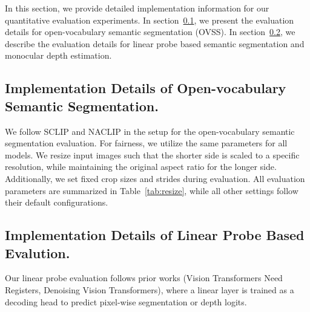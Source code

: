 In this section, we provide detailed implementation information for our quantitative evaluation experiments. 
In section~\ref{ovssimpl}, we present the evaluation details for open-vocabulary semantic segmentation (OVSS). In section~\ref{linearimpl}, we describe the evaluation details for linear probe based semantic segmentation and monocular depth estimation.

\subsection{Implementation Details of Open-vocabulary Semantic Segmentation.}
\label{ovssimpl}
We follow SCLIP and NACLIP in the setup for the open-vocabulary semantic segmentation evaluation. For fairness, we utilize the same parameters for all models. We resize input images such that the shorter side is scaled to a specific resolution, while maintaining the original aspect ratio for the longer side. Additionally, we set fixed crop sizes and strides during evaluation. All evaluation parameters are summarized in Table~\ref{tab:resize}, while all other settings follow their default configurations.

\renewcommand{\arraystretch}{1.2}
\begin{table}[t]
\centering
\caption{\textbf{Dataset Specific Details for Open-vocabulary Semantic Segmentation.} We list the per-dataset resolution, crop size, and stride used for each dataset. We maintain the same settings for all methods within a given dataset.}
\vspace{.1cm}
\label{tab:resize}
\end{table}

\subsection{Implementation Details of Linear Probe Based Evalution.}
\label{linearimpl}
Our linear probe evaluation follows prior works (Vision Transformers Need Registers, Denoising Vision Transformers), where a linear layer is trained as a decoding head to predict pixel-wise segmentation or depth logits.


